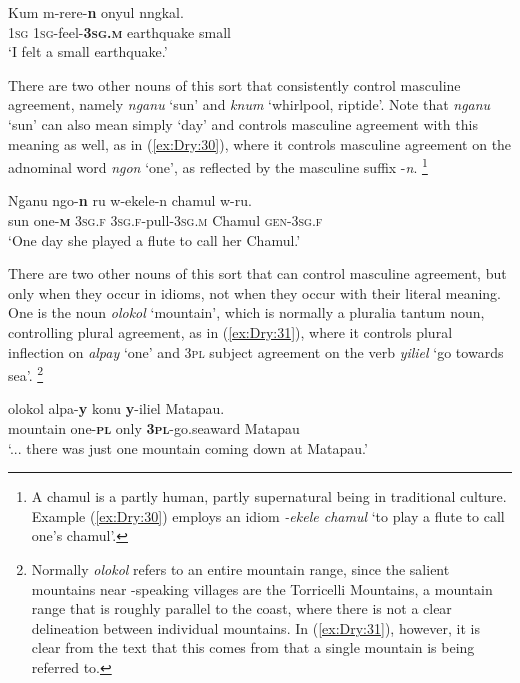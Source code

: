\documentclass[output=collectionpaper]{langsci/langscibook}
\begin{document}
\ea \label{ex:Dry:29}
\gll Kum	m-rere-\textbf{n}	onyul	nngkal.\\
\textsc{1sg} \textsc{1sg}-feel-\textbf{\textsc{3sg.m}} earthquake small\\
\glt `I felt a small earthquake.'
\z

There are two other nouns of this sort that consistently control masculine agreement, namely \textit{nganu} `sun' and \textit{knum} `whirlpool, riptide'. Note that \textit{nganu} `sun' can also mean simply `day' and controls masculine agreement with this meaning as well, as in (\ref{ex:Dry:30}), where it controls masculine agreement on the adnominal word \textit{ngon} `one', as reflected by the masculine suffix -\textit{n}.%
\footnote{A chamul is a partly human, partly supernatural being in traditional  culture. Example (\ref{ex:Dry:30}) employs an idiom \textit{{}-ekele chamul} `to play a flute to call one's chamul'.}

\ea \label{ex:Dry:30}
\gll Nganu	ngo-\textbf{n}	ru	w-ekele-n	chamul w-ru.\\
sun one-\textbf{\textsc{m}} \textsc{3sg.f} \textsc{3sg.f}-pull-\textsc{3sg.m} Chamul \textsc{gen}-\textsc{3sg.f}\\
\glt `One day she played a flute to call her Chamul.'
\z

There are two other nouns of this sort that can control masculine agreement, but only when they occur in idioms, not when they occur with their literal meaning. One is the noun \textit{olokol} `mountain', which is normally a pluralia tantum noun, controlling plural agreement, as in (\ref{ex:Dry:31}), where it controls plural inflection on \textit{alpay} `one' and \textsc{3pl} subject agreement on the verb \textit{yiliel} `go towards sea'.%
\footnote{Normally \textit{olokol} refers to an entire mountain range, since the salient mountains near -speaking villages are the Torricelli Mountains, a mountain range that is roughly parallel to the coast, where there is not a clear delineation between individual mountains. In (\ref{ex:Dry:31}), however, it is clear from the text that this comes from that a single mountain is being referred to.}

\ea \label{ex:Dry:31}
\gll {\ldots}	olokol	alpa-\textbf{y}	konu	\textbf{y}-iliel	Matapau. \\
{} mountain one-\textbf{\textsc{pl}} only \textbf{\textsc{3pl}}-go.seaward Matapau\\
\glt `... there was just one mountain coming down at Matapau.'
\z
\end{document}
